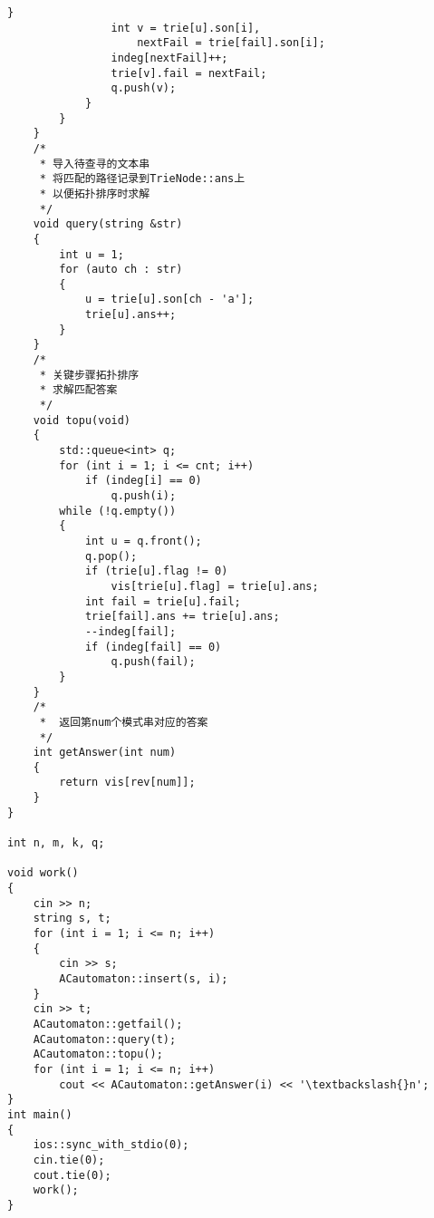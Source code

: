 \documentclass{ctexbook}  %
\begin{document}
\begin{Verbatim}[fontsize=\small]
                }
                int v = trie[u].son[i],
                    nextFail = trie[fail].son[i];
                indeg[nextFail]++;
                trie[v].fail = nextFail;
                q.push(v);
            }
        }
    }
    /*
     * 导入待查寻的文本串
     * 将匹配的路径记录到TrieNode::ans上
     * 以便拓扑排序时求解
     */
    void query(string &str)
    {
        int u = 1;
        for (auto ch : str)
        {
            u = trie[u].son[ch - 'a'];
            trie[u].ans++;
        }
    }
    /*
     * 关键步骤拓扑排序
     * 求解匹配答案
     */
    void topu(void)
    {
        std::queue<int> q;
        for (int i = 1; i <= cnt; i++)
            if (indeg[i] == 0)
                q.push(i);
        while (!q.empty())
        {
            int u = q.front();
            q.pop();
            if (trie[u].flag != 0)
                vis[trie[u].flag] = trie[u].ans;
            int fail = trie[u].fail;
            trie[fail].ans += trie[u].ans;
            --indeg[fail];
            if (indeg[fail] == 0)
                q.push(fail);
        }
    }
    /*
     *  返回第num个模式串对应的答案
     */
    int getAnswer(int num)
    {
        return vis[rev[num]];
    }
}

int n, m, k, q;

void work()
{
    cin >> n;
    string s, t;
    for (int i = 1; i <= n; i++)
    {
        cin >> s;
        ACautomaton::insert(s, i);
    }
    cin >> t;
    ACautomaton::getfail();
    ACautomaton::query(t);
    ACautomaton::topu();
    for (int i = 1; i <= n; i++)
        cout << ACautomaton::getAnswer(i) << '\textbackslash{}n';
}
int main()
{
    ios::sync_with_stdio(0);
    cin.tie(0);
    cout.tie(0);
    work();
}
\end{Verbatim}
\end{document}
